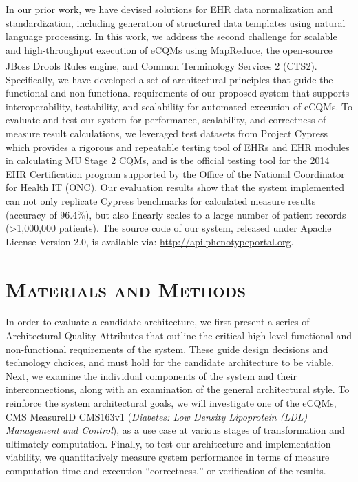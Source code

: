 \documentclass{amia}
\begin{document}
In our prior work\cite{rea2012building}, we have devised solutions for EHR data normalization and standardization, including generation of structured data templates using natural language processing. In this work, we address the second challenge for scalable and high-throughput execution of eCQMs using MapReduce, the open-source JBoss\textsuperscript{\textregistered} Drools Rules engine, and Common Terminology Services 2 (CTS2)\cite{cts2,bali2013drools}. Specifically, we have developed a set of architectural principles that guide the functional and non-functional requirements of our proposed system that supports interoperability, testability, and scalability for automated execution of eCQMs. To evaluate and test our system for performance, scalability, and correctness of measure result calculations, we leveraged test datasets from Project Cypress which provides a rigorous and repeatable testing tool of EHRs and EHR modules in calculating MU Stage 2 CQMs, and is the official testing tool for the 2014 EHR Certification program supported by the Office of the National Coordinator for Health IT (ONC). Our evaluation results show that the system implemented can not only replicate Cypress benchmarks for calculated measure results (accuracy of 96.4\%), but also linearly scales to a large number of patient records (\textgreater1,000,000 patients). The source code of our system, released under Apache License Version 2.0, is available via: \url{http://api.phenotypeportal.org}.


\section{\textsc{Materials and Methods}}
In order to evaluate a candidate architecture, we first present a series of Architectural Quality Attributes that outline the critical high-level functional and non-functional requirements of the system. These guide design decisions and technology choices, and must hold for the candidate architecture to be viable. Next, we examine the individual components of the system and their interconnections, along with an examination of the general architectural style. To reinforce the system architectural goals, we will investigate one of the eCQMs, CMS MeasureID CMS163v1 (\textit{Diabetes: Low Density Lipoprotein (LDL) Management and Control}), as a use case at various stages of transformation and ultimately computation. Finally, to test our architecture and implementation viability, we quantitatively measure system performance in terms of measure computation time and execution ``correctness,'' or verification of the results.
\end{document}
